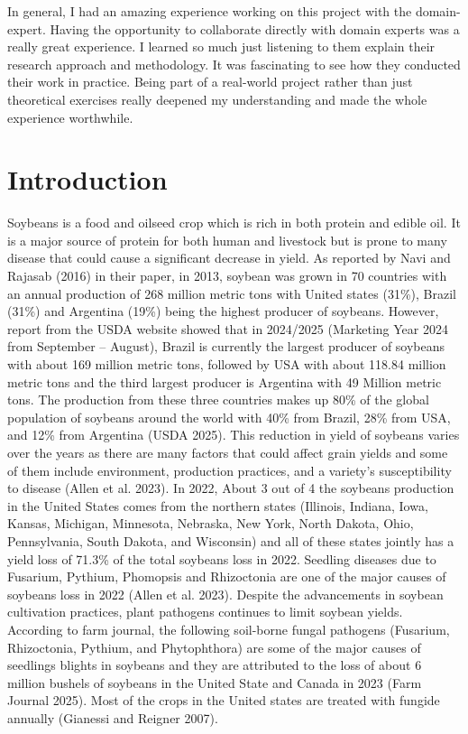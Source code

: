 \documentclass[
  10pt,
  letterpaper,
  twocolumn]{article}
\begin{document}
In general, I had an amazing experience working on this project with the
domain-expert. Having the opportunity to collaborate directly with
domain experts was a really great experience. I learned so much just
listening to them explain their research approach and methodology. It
was fascinating to see how they conducted their work in practice. Being
part of a real-world project rather than just theoretical exercises
really deepened my understanding and made the whole experience
worthwhile.

\hypertarget{introduction}{%
\section{Introduction}\label{introduction}}

\vspace{-1em}

Soybeans is a food and oilseed crop which is rich in both protein and
edible oil. It is a major source of protein for both human and livestock
but is prone to many disease that could cause a significant decrease in
yield. As reported by Navi and Rajasab (2016) in their paper, in 2013,
soybean was grown in 70 countries with an annual production of 268
million metric tons with United states (31\%), Brazil (31\%) and
Argentina (19\%) being the highest producer of soybeans. However, report
from the USDA website showed that in 2024/2025 (Marketing Year 2024 from
September -- August), Brazil is currently the largest producer of
soybeans with about 169 million metric tons, followed by USA with about
118.84 million metric tons and the third largest producer is Argentina
with 49 Million metric tons. The production from these three countries
makes up 80\% of the global population of soybeans around the world with
40\% from Brazil, 28\% from USA, and 12\% from Argentina (USDA 2025).
This reduction in yield of soybeans varies over the years as there are
many factors that could affect grain yields and some of them include
environment, production practices, and a variety's susceptibility to
disease (Allen et al. 2023). In 2022, About 3 out of 4 the soybeans
production in the United States comes from the northern states
(Illinois, Indiana, Iowa, Kansas, Michigan, Minnesota, Nebraska, New
York, North Dakota, Ohio, Pennsylvania, South Dakota, and Wisconsin) and
all of these states jointly has a yield loss of 71.3\% of the total
soybeans loss in 2022. Seedling diseases due to Fusarium, Pythium,
Phomopsis and Rhizoctonia are one of the major causes of soybeans loss
in 2022 (Allen et al. 2023). Despite the advancements in soybean
cultivation practices, plant pathogens continues to limit soybean
yields. According to farm journal, the following soil-borne fungal
pathogens (Fusarium, Rhizoctonia, Pythium, and Phytophthora) are some of
the major causes of seedlings blights in soybeans and they are
attributed to the loss of about 6 million bushels of soybeans in the
United State and Canada in 2023 (Farm Journal 2025). Most of the crops
in the United states are treated with fungide annually (Gianessi and
Reigner 2007).
\end{document}
